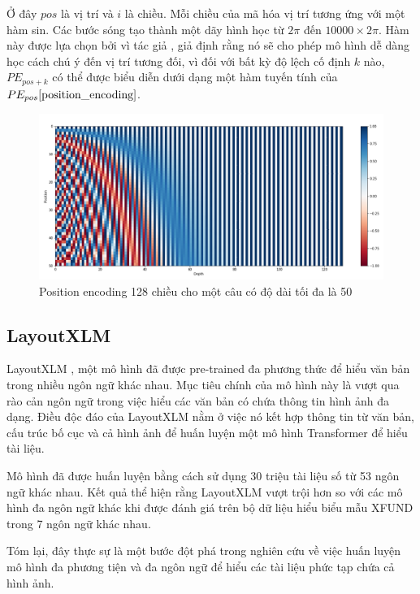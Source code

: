 Ở đây $pos$ là vị trí và $i$ là chiều. Mỗi chiều của mã hóa vị trí tương ứng với một hàm sin. Các bước sóng tạo thành một dãy hình học từ $2\pi$ đến $10000 \times 2\pi$. Hàm này được lựa chọn bởi vì tác giả \cite{vaswani2023attention}, giả định rằng nó sẽ cho phép mô hình dễ dàng học cách chú ý đến vị trí tương đối, vì đối với bất kỳ độ lệch cố định $k$ nào, $PE_{pos+k}$ có thể được biểu diễn dưới dạng một hàm tuyến tính của $PE_{pos} \ref{position_encoding}$.
\begin{figure}[h]
    \includegraphics[scale=0.40]{images/positional_encoding.png}
    \centering
    \caption{Position encoding 128 chiều cho một câu có độ dài tối đa là 50}
    \label{position_encoding}
\end{figure}

\subsection{LayoutXLM}
LayoutXLM \cite{xu2021layoutxlm}, một mô hình đã được pre-trained đa phương thức để hiểu văn bản trong nhiều ngôn ngữ khác nhau. Mục tiêu chính của mô hình này là vượt qua rào cản ngôn ngữ trong việc hiểu các văn bản có chứa thông tin hình ảnh đa dạng. Điều độc đáo của LayoutXLM nằm ở việc nó kết hợp thông tin từ văn bản, cấu trúc bố cục và cả hình ảnh để huấn luyện một mô hình Transformer để hiểu tài liệu.

Mô hình đã được huấn luyện bằng cách sử dụng 30 triệu tài liệu số từ 53 ngôn ngữ khác nhau. Kết quả thể hiện rằng LayoutXLM vượt trội hơn so với các mô hình đa ngôn ngữ khác khi được đánh giá trên bộ dữ liệu hiểu biểu mẫu XFUND trong 7 ngôn ngữ khác nhau.

Tóm lại, đây thực sự là một bước đột phá trong nghiên cứu về việc huấn luyện mô hình đa phương tiện và đa ngôn ngữ để hiểu các tài liệu phức tạp chứa cả hình ảnh.

